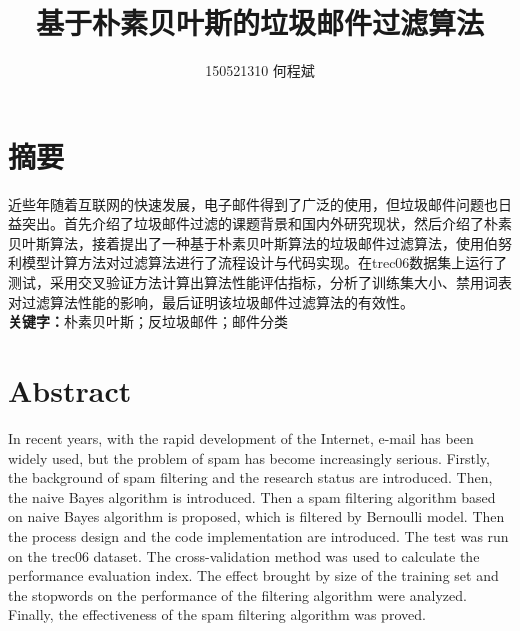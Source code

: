 \documentclass[UTF8,zihao=-4]{ctexart}
\title{基于朴素贝叶斯的垃圾邮件过滤算法}
\author{150521310 何程斌}
\date{}
\begin{document}


\section*{摘要}

  \linespread{1.25}\songti{}
   近些年随着互联网的快速发展，电子邮件得到了广泛的使用，但垃圾邮件问题也日益突出。首先介绍了垃圾邮件过滤的课题背景和国内外研究现状，然后介绍了朴素贝叶斯算法，接着提出了一种基于朴素贝叶斯算法的垃圾邮件过滤算法，使用伯努利模型计算方法对过滤算法进行了流程设计与代码实现。在trec06数据集上运行了测试，采用交叉验证方法计算出算法性能评估指标，分析了训练集大小、禁用词表对过滤算法性能的影响，最后证明该垃圾邮件过滤算法的有效性。
   \\
   

  {\noindent\heiti{}\textbf{关键字：}朴素贝叶斯；反垃圾邮件；邮件分类}
\newpage

\section*{Abstract}

  \linespread{1.25}
	In recent years, with the rapid development of the Internet, e-mail has been widely used, but the problem of spam has become increasingly serious. Firstly, the background of spam filtering and the research status are introduced. Then, the naive Bayes algorithm is introduced. Then a spam filtering algorithm based on naive Bayes algorithm is proposed, which is filtered by Bernoulli model. Then the process design and the code implementation are introduced. The test was run on the trec06 dataset. The cross-validation method was used to calculate the performance evaluation index. The effect brought by size of the training set and the stopwords on the performance of the filtering algorithm were analyzed. Finally, the effectiveness of the spam filtering algorithm was proved.
	\\
\end{document}
